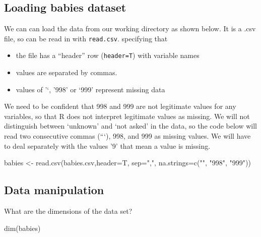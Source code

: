 \documentclass[
]{book}
\newenvironment{Shaded}{\begin{snugshade}}{\end{snugshade}}
\newcommand{\AttributeTok}[1]{\textcolor[rgb]{0.77,0.63,0.00}{#1}}
\newcommand{\FunctionTok}[1]{\textcolor[rgb]{0.00,0.00,0.00}{#1}}
\newcommand{\NormalTok}[1]{#1}
\newcommand{\OtherTok}[1]{\textcolor[rgb]{0.56,0.35,0.01}{#1}}
\newcommand{\StringTok}[1]{\textcolor[rgb]{0.31,0.60,0.02}{#1}}
\providecommand{\tightlist}{%
  \setlength{\itemsep}{0pt}\setlength{\parskip}{0pt}}
\begin{document}
\hypertarget{loading-babies-dataset}{%
\subsection*{Loading babies dataset}\label{loading-babies-dataset}}

We can can load the data from our working directory as shown below. It is a .csv file, so can be read in with \texttt{read.csv}. specifying that

\begin{itemize}
\tightlist
\item
  the file has a ``header'' row (\texttt{header=T}) with variable names
\item
  values are separated by commas.\\
\item
  values of '`, '998' or `999' represent missing data
\end{itemize}

We need to be confident that 998 and 999 are not legitimate values for any variables, so that R does not interpret legitimate values as missing. We will not distinguish between `unknown' and `not asked' in the data, so the code below will read two consecutive commas (```), 998, and 999 as missing values. We will have to deal separately with the values '9' that mean a value is missing.

\begin{Shaded}
\begin{Highlighting}[]
\NormalTok{babies }\OtherTok{\textless{}{-}} \FunctionTok{read.csv}\NormalTok{(}\StringTok{\textquotesingle{}babies.csv\textquotesingle{}}\NormalTok{,}\AttributeTok{header=}\NormalTok{T, }\AttributeTok{sep=}\StringTok{","}\NormalTok{, }
                     \AttributeTok{na.strings=}\FunctionTok{c}\NormalTok{(}\StringTok{""}\NormalTok{, }\StringTok{"998"}\NormalTok{, }\StringTok{"999"}\NormalTok{))}
\end{Highlighting}
\end{Shaded}

\hypertarget{data-manipulation}{%
\subsection*{Data manipulation}\label{data-manipulation}}

What are the dimensions of the data set?

\begin{Shaded}
\begin{Highlighting}[]
\FunctionTok{dim}\NormalTok{(babies)}
\end{Highlighting}
\end{Shaded}
\end{document}
